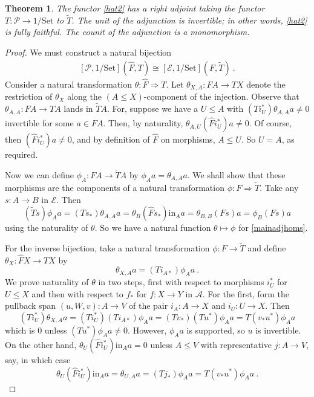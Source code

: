 \documentclass[a4paper,12pt,reqno]{amsart}
\newtheorem{theorem}{Theorem}[section] %
\theoremstyle{definition}
\theoremstyle{fact}
\theoremstyle{genquest}
\theoremstyle{step}
\newcommand{\lra}{\longrightarrow}
\newcommand{\Lra}{\Longrightarrow}
\def\CA{{\mathscr A}}
\def\CE{{\mathscr E}}
\def\CP{{\mathscr P}}
\begin{document}
\begin{theorem}\label{mainadj}
The functor \eqref{hat2} has a right adjoint taking the functor $T : \CP \lra 1/\mathrm{Set}$ to $\widetilde{T}$.
The unit of the adjunction is invertible; in other words, \eqref{hat2} is fully faithful.
The counit of the adjunction is a monomorphism. 
\end{theorem}
\begin{proof}
We must construct a natural bijection
\begin{eqnarray}\label{mainadjhoms}
[\CP, 1/\mathrm{Set}](\widehat{F},T) \cong [\CE, 1/\mathrm{Set}](F,\widetilde{T}) \ .
\end{eqnarray}
Consider a natural transformation $\theta : \widehat{F} \Lra T$. 
Let $\theta_{X,A} : FA \lra TX$ denote the restriction of $\theta_X$ along
the $(A\le X)$-component of the injection. 
Observe that $\theta_{A,A} : FA \lra TA$ lands in $\widetilde{T}A$. 
For, suppose we have a $U\le A$ with 
$(Ti_U^*)\theta_{A,A}a\neq 0$
invertible for some $a\in FA$. Then, by naturality,
$\theta_{A,U}(\widehat{F}i_U^*)a\neq 0$.
Of course, then $(\widehat{F}i_U^*)a\neq 0$, and by definition of
$\widehat{F}$ on morphisms, $A\le U$. So $U=A$, as required.

Now we can define $\phi_A : FA \lra \widetilde{T}A$ by $\phi_Aa=\theta_{A,A}a$.
We shall show that these morphisms are the components of a 
natural transformation $\phi : F \Lra \widetilde{T}$. Take any
$s:A\lra B$ in $\CE$. Then
$$(\widetilde{T}s)\phi_Aa = (Ts_*)\theta_{A,A}a = \theta_B(\widehat{F}s_*)\mathrm{in}_Aa=\theta_{B,B}(Fs)a = \phi_B(Fs)a$$
using the naturality of $\theta$. 
So we have a natural function $\theta \mapsto \phi$ for \eqref{mainadjhoms}.  

For the inverse bijection, take a natural transformation $\phi : F \lra \widetilde{T}$
and define $\theta_X : \widehat{F}X \lra TX$ by
$$\theta_{X,A}a = (Ti_{A *})\phi_Aa \ .$$ 
We prove naturality of $\theta$ in two steps, first with respect to morphisms 
$i_U^*$ for $U\le X$ and then with respect to $f_*$ for $f : X\lra Y$
in $\CA$.
For the first, form the pullback span $(u,W,v) : A \lra V$ of the pair 
$i_A : A \lra X$ and $i_U :U \lra X$. Then
$$(Ti_U^*)\theta_{X,A}a = (Ti_U^*)(Ti_{A *})\phi_Aa = (Tv_*)(Tu^*)\phi_Aa = T(v_*u^*)\phi_Aa$$
which is $0$ unless $(Tu^*)\phi_Aa \neq 0$. However, $\phi_Aa$ is supported,
so $u$ is invertible. On the other hand, 
$\theta_U(\widehat{F}i_U^*)\mathrm{in}_Aa = 0$
unless $A\le V$ with representative $j:A\lra V$, say, in which case 
$$\theta_U(\widehat{F}i_U^*)\mathrm{in}_Aa = \theta_{U,A}a = (Tj_*)\phi_Aa = T(v_*u^*)\phi_Aa \ .$$ 


\end{proof}
\end{document}

